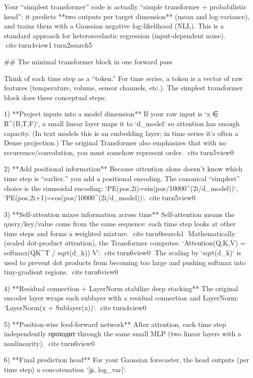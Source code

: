 \documentclass[a4paper]{article}
\begin{document}
    Your “simplest transformer” code is actually “simple transformer + probabilistic head”: it predicts **two outputs per target dimension** (mean and log-variance), and trains them with a Gaussian negative log-likelihood (NLL). This is a standard approach for heteroscedastic regression (input-dependent noise). citeturn4view1turn2search5
    
    ## The minimal transformer block in one forward pass
    
    Think of each time step as a “token.” For time series, a token is a vector of raw features (temperature, volume, sensor channels, etc.). The simplest transformer block does these conceptual steps:
    
    1) **Project inputs into a model dimension**
    If your raw input is `x ∈ R^(B,T,F)`, a small linear layer maps it to `d_model` so attention has enough capacity. (In text models this is an embedding layer; in time series it’s often a Dense projection.) The original Transformer also emphasizes that with no recurrence/convolution, you must somehow represent order. citeturn5view0
    
    2) **Add positional information**
    Because attention alone doesn’t know which time step is “earlier,” you add a positional encoding. The canonical “simplest” choice is the sinusoidal encoding:
    `PE(pos,2i)=sin(pos/10000^(2i/d_model))`, `PE(pos,2i+1)=cos(pos/10000^(2i/d_model))`. citeturn5view0
    
    3) **Self-attention mixes information across time**
    Self-attention means the query/key/value come from the same sequence: each time step looks at other time steps and forms a weighted mixture. citeturn0search1
    Mathematically (scaled dot-product attention), the Transformer computes:
    `Attention(Q,K,V) = softmax(QK^T / sqrt(d_k)) V`. citeturn6view0
    The scaling by `sqrt(d_k)` is used to prevent dot products from becoming too large and pushing softmax into tiny-gradient regions. citeturn6view0
    
    4) **Residual connection + LayerNorm stabilize deep stacking**
    The original encoder layer wraps each sublayer with a residual connection and LayerNorm: `LayerNorm(x + Sublayer(x))`. citeturn4view0
    
    5) **Position-wise feed-forward network**
    After attention, each time step independently проходит through the same small MLP (two linear layers with a nonlinearity). citeturn6view0
    
    6) **Final prediction head**
    For your Gaussian forecaster, the head outputs (per time step) a concatenation `[μ, log_var]`.
    
\end{document}
